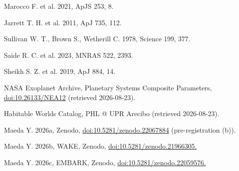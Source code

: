 \documentclass[11pt]{article}
\begin{document}
\noindent [22] Marocco F. et al. 2021, ApJS 253, 8.\par\smallskip
\noindent [23] Jarrett T. H. et al. 2011, ApJ 735, 112.\par\smallskip
\noindent [24] Sullivan W. T., Brown S., Wetherill C. 1978, Science 199, 377.\par\smallskip
\noindent [25] Saide R. C. et al. 2023, MNRAS 522, 2393.\par\smallskip
\noindent [26] Sheikh S. Z. et al. 2019, ApJ 884, 14.\par\smallskip
\noindent [27] NASA Exoplanet Archive, Planetary Systems Composite Parameters, \url{doi:10.26133/NEA12} (retrieved 2026-08-23).\par\smallskip
\noindent [28] Habitable Worlds Catalog, PHL @ UPR Arecibo (retrieved 2026-08-23).\par\smallskip
\noindent [29] Maeda Y. 2026a, Zenodo, \url{doi:10.5281/zenodo.22067884} (pre-registration (b)).\par\smallskip
\noindent [30] Maeda Y. 2026b, WAKE, Zenodo, \url{doi:10.5281/zenodo.21966305.}\par\smallskip
\noindent [31] Maeda Y. 2026c, EMBARK, Zenodo, \url{doi:10.5281/zenodo.22059576.}\par\smallskip
\end{document}
